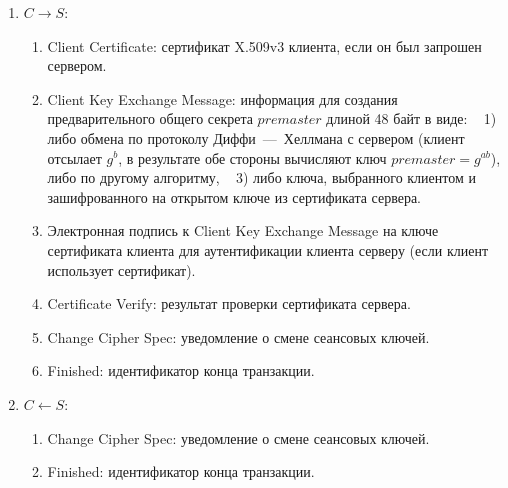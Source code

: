 \begin{enumerate}
    \item $C \rightarrow S$:
        \begin{enumerate}
            \item Client Certificate: сертификат X.509v3 клиента, если он был запрошен сервером.
            \item Client Key Exchange Message: информация для создания предварительного общего секрета $premaster$ длиной 48 байт в виде: ~ 1) либо обмена по протоколу Диффи~---~Хеллмана с сервером (клиент отсылает $g^b$, в результате обе стороны вычисляют ключ $premaster = g^{ab}$), либо по другому алгоритму, ~ 3) либо ключа, выбранного клиентом и зашифрованного на открытом ключе из сертификата сервера.
            \item Электронная подпись к Client Key Exchange Message на ключе сертификата клиента для аутентификации клиента серверу (если клиент использует сертификат).
            \item Certificate Verify: результат проверки сертификата сервера.
            \item Change Cipher Spec: уведомление о смене сеансовых ключей.
            \item Finished: идентификатор конца транзакции.
        \end{enumerate}

    \item $C \leftarrow S$:
        \begin{enumerate}
            \item Change Cipher Spec: уведомление о смене сеансовых ключей.
            \item Finished: идентификатор конца транзакции.
        \end{enumerate}
\end{enumerate}




